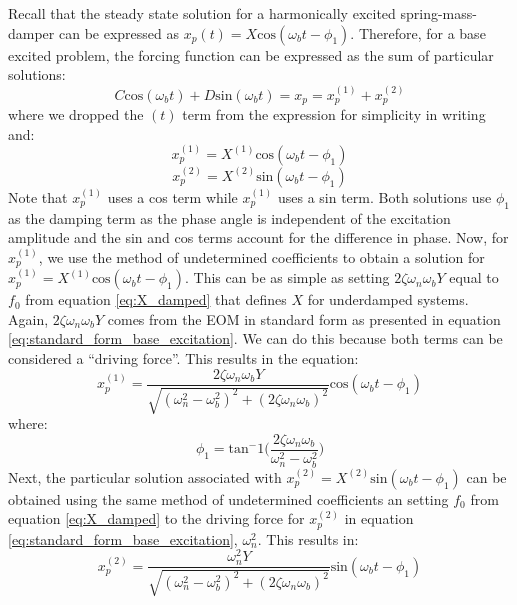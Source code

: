 \documentclass[12pt,letter]{article}
\numberwithin{ex}{section} %
\numberwithin{re}{section} %
\begin{document}
				 Recall that the steady state solution for a harmonically excited spring-mass-damper can be expressed as $x_p(t) = X\text{cos}(\omega_b t - \phi_1)$. Therefore, for a base excited problem, the forcing function can be expressed as the sum of particular solutions:
				\begin{equation}
					C \text{cos}(\omega_b t)  + D \text{sin}(\omega_b t)   = x_p = 	x_p^{(1)} + 	x_p^{(2)} 
				\end{equation}
				where we dropped the $(t)$ term from the expression for simplicity in writing and:
				\begin{equation}
					x_p^{(1)} = X^{(1)}\text{cos}(\omega_b t - \phi_1)
				\end{equation}
				\begin{equation}
					x_p^{(2)} = X^{(2)} \text{sin}(\omega_b t - \phi_1)
				\end{equation}
				Note that $x_p^{(1)}$ uses a cos term while $x_p^{(1)}$ uses a sin term. Both solutions use $\phi_1$ as the damping term as the phase angle is independent of the excitation amplitude and the sin and cos terms account for the difference in phase. Now, for $x_p^{(1)}$, we use the method of undetermined coefficients to obtain a solution for $x_p^{(1)} = X^{(1)}\text{cos}(\omega_b t - \phi_1)$. This can be as simple as setting $2 \zeta \omega_n \omega_b Y$ equal to $f_0$ from equation \ref{eq:X_damped} that defines $X$ for underdamped systems. Again, $2 \zeta \omega_n \omega_b Y$  comes from the EOM in standard form as presented in equation 	
				\ref{eq:standard_form_base_excitation}. We can do this because both terms can be considered a ``driving force''. This results in the equation:
				\begin{equation}
					x_p^{(1)} = \frac{2 \zeta \omega_n \omega_b Y}{\sqrt{(\omega_n^2 - \omega_b^2)^2 +  (2\zeta \omega_n \omega_b)^2}}  \text{cos}(\omega_b t - \phi_1)
					\label{eq:xp_1}
				\end{equation}
				where:
				\begin{equation}
					\phi_1 = \text{tan}^-1\bigg(\frac{2\zeta \omega_n \omega_b}{\omega_n^2 - \omega_b^2}\bigg)
				\end{equation}	
				Next, the particular solution associated with $x_p^{(2)} = X^{(2)} \text{sin}(\omega_b t - \phi_1)$ can be obtained using the same method of undetermined coefficients an setting $f_0$ from equation \ref{eq:X_damped} to the driving force for $x_p^{(2)}$ in equation  \ref{eq:standard_form_base_excitation}, $\omega_n^2$. This results in:
				\begin{equation}
					x_p^{(2)} = \frac{\omega_n^2 Y}{\sqrt{(\omega_n^2 - \omega_b^2)^2 +  (2\zeta \omega_n \omega_b)^2}}  \text{sin}(\omega_b t - \phi_1)
					\label{eq:xp_2}
				\end{equation}
\end{document}
